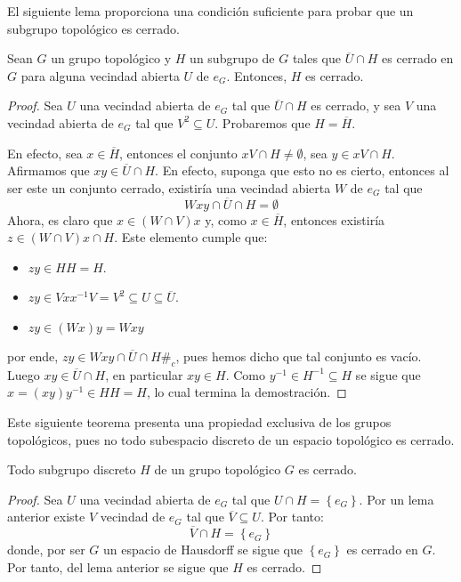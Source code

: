 \documentclass[12pt]{report}
\theoremstyle{largebreak}
\newcommand{\contradiction}{\ensuremath{\#_c}}
\newcommand{\Cls}[1]{\ensuremath{\overline{#1}}}
\begin{document}
    El siguiente lema proporciona una condición suficiente para probar que un subgrupo topológico es cerrado.

    \begin{lema}
        Sean $G$ un grupo topológico y $H$ un subgrupo de $G$ tales que $\Cls{U}\cap H$ es cerrado en $G$ para alguna vecindad abierta $U$ de $e_G$. Entonces, $H$ es cerrado.
    \end{lema}

    \begin{proof}
        Sea $U$ una vecindad abierta de $e_G$ tal que $\Cls{U}\cap H$ es cerrado, y sea $V$ una vecindad abierta de $e_G$ tal que $V^{2}\subseteq U$. Probaremos que $H=\Cls{H}$.

        En efecto, sea $x\in \Cls{H}$, entonces el conjunto $xV\cap H\neq\emptyset$, sea $y\in xV\cap H$. Afirmamos que $xy\in \Cls{U}\cap H$. En efecto, suponga que esto no es cierto, entonces al ser este un conjunto cerrado, existiría una vecindad abierta $W$ de $e_G$ tal que
        \begin{equation*}
            Wxy\cap \Cls{U}\cap H=\emptyset
        \end{equation*}
        Ahora, es claro que $x\in (W\cap V)x$ y, como $x\in\Cls{H}$, entonces existiría $z\in (W\cap V)x\cap H$. Este elemento cumple que:
        \begin{itemize}
            \item $zy\in HH=H$.
            \item $zy\in Vxx^{-1}V=V^{2}\subseteq U\subseteq\Cls{U}$.
            \item $zy\in (Wx)y=Wxy$
        \end{itemize}
        por ende, $zy\in Wxy\cap \Cls{U}\cap H$\contradiction, pues hemos dicho que tal conjunto es vacío. Luego $xy\in\Cls{U}\cap H$, en particular $xy\in H$. Como $y^{-1}\in H^{-1}\subseteq H$ se sigue que $x=(xy)y^{-1}\in HH=H$, lo cual termina la demostración.
    \end{proof}

    Este siguiente teorema presenta una propiedad exclusiva de los grupos topológicos, pues no todo subespacio discreto de un espacio topológico es cerrado.

    \begin{propo}
        Todo subgrupo discreto $H$ de un grupo topológico $G$ es cerrado.
    \end{propo}

    \begin{proof}
        Sea $U$ una vecindad abierta de $e_G$ tal que $U\cap H=\left\{e_G\right\}$. Por un lema anterior existe $V$ vecindad de $e_G$ tal que $\Cls{V}\subseteq U$. Por tanto:
        \begin{equation*}
            \Cls{V}\cap H=\left\{e_G\right\}
        \end{equation*}
        donde, por ser $G$ un espacio de Hausdorff se sigue que $\left\{e_G\right\}$ es cerrado en $G$. Por tanto, del lema anterior se sigue que $H$ es cerrado.
    \end{proof}
\end{document}
